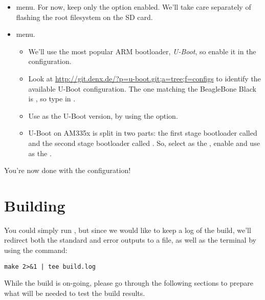 \begin{itemize}
\item {} menu. For now, keep only the  option enabled. We'll take care separately of
  flashing the root filesystem on the SD card.

\item {} menu.

  \begin{itemize}

  \item We'll use the most popular ARM bootloader, {\em U-Boot}, so
    enable it in the configuration.

  \item Look at
    \url{http://git.denx.de/?p=u-boot.git;a=tree;f=configs} to
    identify the available U-Boot configuration. The one matching the
    BeagleBone Black is , so type
     in .

  \item Use  as the U-Boot version, by using the
     option.

  \item U-Boot on AM335x is split in two parts: the first stage
    bootloader called  and the second stage bootloader
    called . So, select  as the
    , enable  and use  as the .

  \end{itemize}

\end{itemize}

You're now done with the configuration!

\section{Building}

You could simply run , but since we would like to keep a
log of the build, we'll redirect both the standard and error outputs
to a file, as well as the terminal by using the  command:

\begin{verbatim}
make 2>&1 | tee build.log
\end{verbatim}

While the build is on-going, please go through the following sections
to prepare what will be needed to test the build results.

